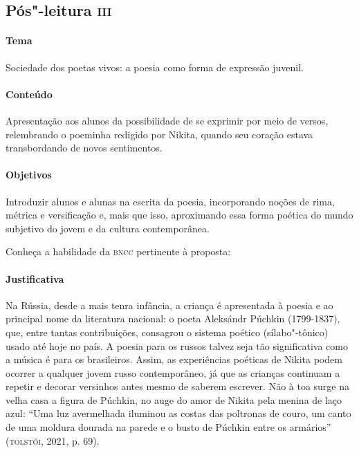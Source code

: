 \documentclass[11pt]{extarticle}
\begin{document}
\subsection{Pós"-leitura \textsc{iii}}

\paragraph{Tema} Sociedade dos poetas vivos: a poesia como forma de expressão
juvenil.

\paragraph{Conteúdo}
Apresentação aos alunos da possibilidade de se exprimir por meio de
versos, relembrando o poeminha redigido por Nikita, quando seu coração
estava transbordando de novos sentimentos.

\paragraph{Objetivos}
Introduzir alunos e alunas na escrita da poesia, incorporando noções de
rima, métrica e versificação e, mais que isso, aproximando essa forma
poética do mundo subjetivo do jovem e da cultura contemporânea.

Conheça a habilidade da \textsc{bncc} pertinente à proposta:


\paragraph{Justificativa}
Na Rússia, desde a mais tenra infância, a criança é apresentada à poesia
e ao principal nome da literatura nacional: o poeta Aleksándr Púchkin
(1799-1837), que, entre tantas contribuições, consagrou o sistema
poético (sílabo"-tônico) usado até hoje no país. A poesia para os russos
talvez seja tão significativa como a música é para os brasileiros.
Assim, as experiências poéticas de Nikita podem ocorrer a qualquer jovem
russo contemporâneo, já que as crianças continuam a repetir e
decorar versinhos antes mesmo de saberem escrever. Não à toa surge na
velha casa a figura de Púchkin, no auge do amor de Nikita pela menina de
laço azul: ``Uma luz avermelhada iluminou as costas das poltronas de
couro, um canto de uma moldura dourada na parede e o busto de Púchkin
entre os armários'' (\textsc{tolstói}, 2021, p. 69).

\end{document}
